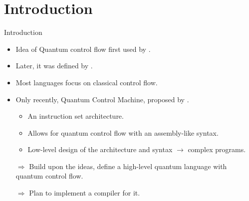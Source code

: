 \section{Introduction}


\begin{frame}{Introduction}
    \begin{itemize}
        \item Idea of Quantum control flow first used by \cite{AlGr05}.
        \item Later, it was defined by \cite{YYF12}.
        \item Most languages focus on classical control flow.
        \item Only recently, Quantum Control Machine, proposed by \cite{YVC24}.
        \begin{itemize}
            \item An instruction set architecture.
            \item Allows for quantum control flow with an assembly-like syntax.
            \item Low-level design of the architecture and syntax $\to$ complex programs.
        \end{itemize}
        \item[$\Rightarrow$] Build upon the ideas, define a high-level quantum language with quantum control flow.
        \item[$\Rightarrow$] Plan to implement a compiler for it.
    \end{itemize}
\end{frame}